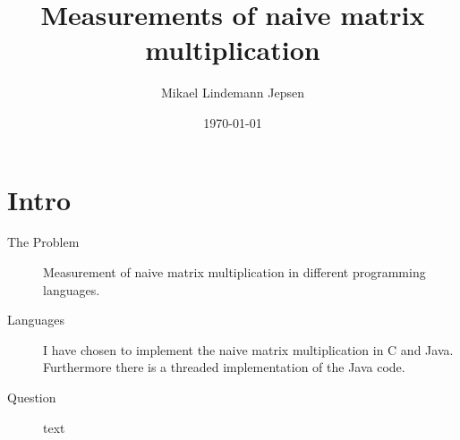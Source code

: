 \documentclass{article}
\author{Mikael Lindemann Jepsen}
\date{\today}
\title{Measurements of naive matrix multiplication}
\begin{document}
	\maketitle
	\section{Intro}
	\begin{description}
		\item [The Problem] Measurement of naive matrix multiplication in different programming languages.
		\item [Languages] I have chosen to implement the naive matrix multiplication in C and Java. Furthermore there is a threaded implementation of the Java code.
		\item [Question] text
	\end{description}
\end{document}

